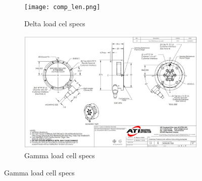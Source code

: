 \documentclass[12pt]{report} %
\begin{document}
\begin{figure}[!ht]
\center

\begin{table}[htbp]
  \centering
  \caption{Load Cell Selection: Resolution}
  \label{tab:va1r}
\end{table}


\begin{table}[htbp]
  \centering
  \caption{Load Cell Selection: Resolution}
  \label{tab:va1r}
\end{table}


\begin{figure}[!ht]
\center
\texttt{[image: comp\_len.png]}
     \caption{Delta load cel specs}
     \label{fig:Delta load cel specs}
\end{figure}

\begin{figure}[!ht]
\center
\includegraphics[width = 140mm]{Gamma.jpg}
     \caption{Gamma load cell specs}
     \label{fig:Gamma load cel specs}
\end{figure}






\end{figure}
\end{document}
